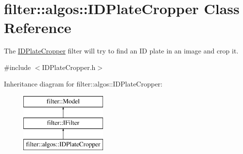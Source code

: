 \hypertarget{classfilter_1_1algos_1_1_i_d_plate_cropper}{}\section{filter\+:\+:algos\+:\+:I\+D\+Plate\+Cropper Class Reference}
\label{classfilter_1_1algos_1_1_i_d_plate_cropper}


The \hyperlink{classfilter_1_1algos_1_1_i_d_plate_cropper}{I\+D\+Plate\+Cropper} filter will try to find an ID plate in an image and crop it.  




{\ttfamily \#include $<$I\+D\+Plate\+Cropper.\+h$>$}

Inheritance diagram for filter\+:\+:algos\+:\+:I\+D\+Plate\+Cropper\+:\begin{figure}[H]
\begin{center}
\leavevmode
\includegraphics[height=3.000000cm]{d9/d7a/classfilter_1_1algos_1_1_i_d_plate_cropper}
\end{center}
\end{figure}
